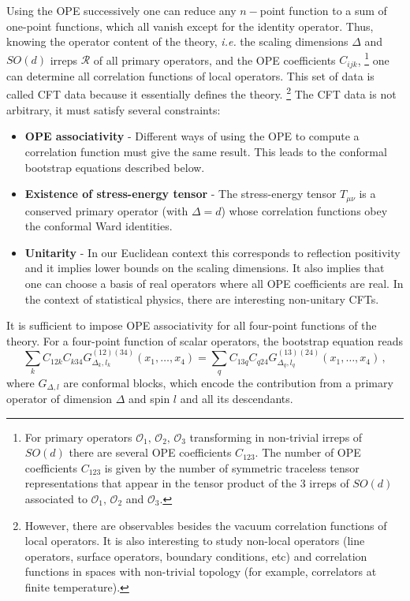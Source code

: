 \documentclass{ws-rv9x6}
\newcommand\be{\begin{equation}}
\newcommand\ee{\end{equation}}
\begin{document}
Using the OPE successively one can reduce any $n-$point function
to a sum of one-point functions, which all vanish except for the identity
operator. Thus, knowing the operator content of the theory, \emph{i.e.}
the scaling dimensions $\Delta$ and $SO(d)$ irreps $\mathcal{R}$
of all primary operators, and the OPE coefficients $C_{ijk}$,%
\footnote{For primary operators $\mathcal{O}_{1},\,\mathcal{O}_{2},\,\mathcal{O}_{3}$
transforming in non-trivial irreps of $SO(d)$ there are several OPE
coefficients $C_{123}$. The number of OPE coefficients $C_{123}$
is given by the number of symmetric traceless tensor representations
that appear in the tensor product of the 3 irreps of $SO(d)$ associated
to $\mathcal{O}_{1},\,\mathcal{O}_{2}$ and $\mathcal{O}_{3}$.%
} one can determine all correlation functions of local operators. This
set of data is called CFT data because it essentially defines the
theory. %
\footnote{However, there are observables besides the vacuum correlation functions of
local operators. It is also interesting to study non-local operators
(line operators, surface operators, boundary conditions, etc) and
correlation functions in spaces with non-trivial topology (for example,
correlators at finite temperature). %
} The CFT data is not arbitrary, it must satisfy several constraints:
\begin{itemize}
\item {\bf OPE associativity} - Different ways of using the OPE to compute a correlation
function must give the same result. This leads to the conformal bootstrap
equations described below.
\item {\bf Existence of stress-energy tensor} - The stress-energy tensor $T_{\mu\nu}$
is a conserved primary operator (with $\Delta=d$) whose correlation
functions obey the conformal Ward identities.
\item {\bf Unitarity} - In our Euclidean context this corresponds to reflection
positivity and it implies lower bounds on the scaling dimensions.
It also implies that one can choose a basis of real operators where
all OPE coefficients are real. In the context of statistical physics, there are interesting non-unitary CFTs.
\end{itemize}
It is sufficient to impose OPE associativity for all four-point functions
of the theory. For a four-point function of scalar operators, the
bootstrap equation reads
\be
\sum_{k}C_{12k}C_{k34}G_{\Delta_{k},l_{k}}^{(12)(34)}(x_{1},\dots,x_{4})=\sum_{q}C_{13q}C_{q24}G_{\Delta_{q},l_{q}}^{(13)(24)}(x_{1},\dots,x_{4}) \,, \nonumber
\ee
where $G_{\Delta,l}$ are conformal blocks, which encode the contribution from
 a primary operator of dimension $\Delta$ and spin $l$ and all
its descendants.
\end{document}
